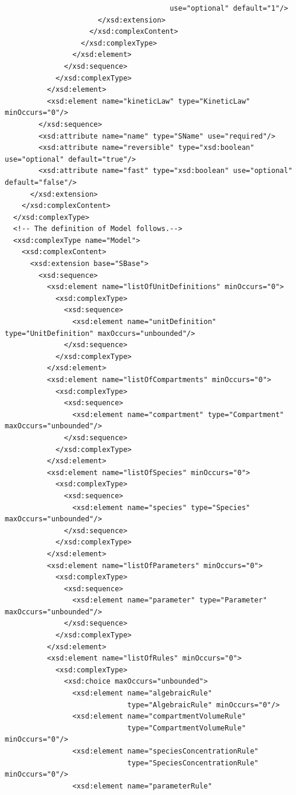 \documentclass[10pt]{cekarticle}
\begin{document}
\begin{small}
\begin{verbatim}
                                       use="optional" default="1"/>
                      </xsd:extension>
                    </xsd:complexContent>
                  </xsd:complexType>
                </xsd:element>
              </xsd:sequence>
            </xsd:complexType>
          </xsd:element>
          <xsd:element name="kineticLaw" type="KineticLaw" minOccurs="0"/>
        </xsd:sequence>
        <xsd:attribute name="name" type="SName" use="required"/>
        <xsd:attribute name="reversible" type="xsd:boolean" use="optional" default="true"/>
        <xsd:attribute name="fast" type="xsd:boolean" use="optional" default="false"/>
      </xsd:extension>
    </xsd:complexContent>
  </xsd:complexType>
  <!-- The definition of Model follows.-->
  <xsd:complexType name="Model">
    <xsd:complexContent>
      <xsd:extension base="SBase">
        <xsd:sequence>
          <xsd:element name="listOfUnitDefinitions" minOccurs="0">
            <xsd:complexType>
              <xsd:sequence>
                <xsd:element name="unitDefinition" type="UnitDefinition" maxOccurs="unbounded"/>
              </xsd:sequence>
            </xsd:complexType>
          </xsd:element>
          <xsd:element name="listOfCompartments" minOccurs="0">
            <xsd:complexType>
              <xsd:sequence>
                <xsd:element name="compartment" type="Compartment" maxOccurs="unbounded"/>
              </xsd:sequence>
            </xsd:complexType>
          </xsd:element>
          <xsd:element name="listOfSpecies" minOccurs="0">
            <xsd:complexType>
              <xsd:sequence>
                <xsd:element name="species" type="Species" maxOccurs="unbounded"/>
              </xsd:sequence>
            </xsd:complexType>
          </xsd:element>
          <xsd:element name="listOfParameters" minOccurs="0">
            <xsd:complexType>
              <xsd:sequence>
                <xsd:element name="parameter" type="Parameter" maxOccurs="unbounded"/>
              </xsd:sequence>
            </xsd:complexType>
          </xsd:element>
          <xsd:element name="listOfRules" minOccurs="0">
            <xsd:complexType>
              <xsd:choice maxOccurs="unbounded">
                <xsd:element name="algebraicRule" 
                             type="AlgebraicRule" minOccurs="0"/>
                <xsd:element name="compartmentVolumeRule" 
                             type="CompartmentVolumeRule" minOccurs="0"/>
                <xsd:element name="speciesConcentrationRule" 
                             type="SpeciesConcentrationRule" minOccurs="0"/>
                <xsd:element name="parameterRule" 

\end{verbatim}
\end{small}
\end{document}
